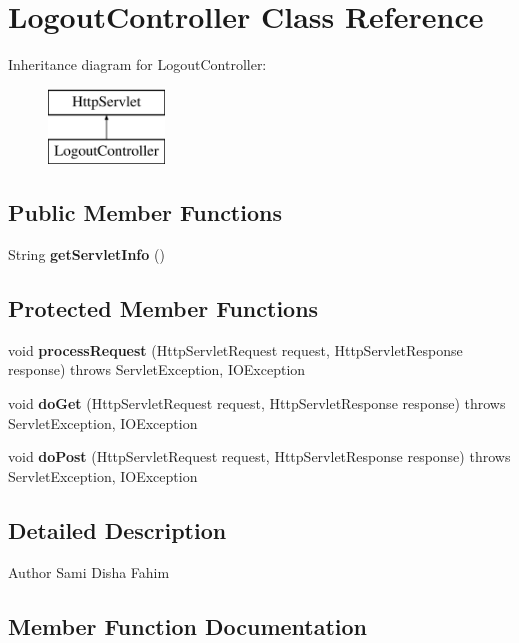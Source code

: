 \section{Logout\+Controller Class Reference}
\label{class_logout_controller}
Inheritance diagram for Logout\+Controller\+:\begin{figure}[H]
\begin{center}
\leavevmode
\includegraphics[height=2.000000cm]{class_logout_controller}
\end{center}
\end{figure}
\subsection*{Public Member Functions}
\begin{DoxyCompactItemize}
\item 
String \textbf{ get\+Servlet\+Info} ()
\end{DoxyCompactItemize}
\subsection*{Protected Member Functions}
\begin{DoxyCompactItemize}
\item 
void \textbf{ process\+Request} (Http\+Servlet\+Request request, Http\+Servlet\+Response response)  throws Servlet\+Exception, I\+O\+Exception 
\item 
void \textbf{ do\+Get} (Http\+Servlet\+Request request, Http\+Servlet\+Response response)  throws Servlet\+Exception, I\+O\+Exception 
\item 
void \textbf{ do\+Post} (Http\+Servlet\+Request request, Http\+Servlet\+Response response)  throws Servlet\+Exception, I\+O\+Exception 
\end{DoxyCompactItemize}


\subsection{Detailed Description}
\begin{DoxyAuthor}{Author}
Sami Disha Fahim 
\end{DoxyAuthor}


\subsection{Member Function Documentation}
\mbox{\label{class_logout_controller_a205eb1dfe5bd846a9b838f55638a053a}} 
